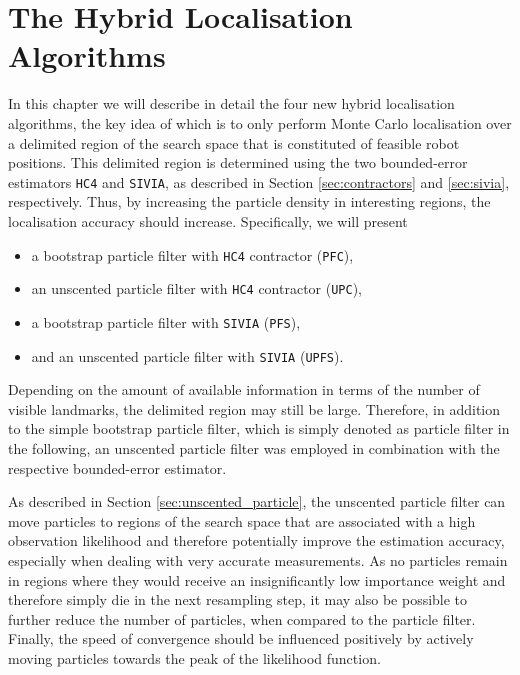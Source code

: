 \chapter{The Hybrid Localisation Algorithms} %
\label{ch:implementation}

In this chapter we will describe in detail the four new hybrid localisation algorithms, the key idea of which is to only perform Monte Carlo localisation over a delimited region of the search space that is constituted of feasible robot positions. This delimited region is determined using the two bounded-error estimators \texttt{HC4} and \texttt{SIVIA}, as described in Section \ref{sec:contractors} and \ref{sec:sivia}, respectively. Thus, by increasing the particle density in interesting regions, the localisation accuracy should increase. Specifically, we will present

\begin{itemize}
	\item a bootstrap particle filter with \texttt{HC4} contractor (\texttt{PFC}),
	\item an unscented particle filter with \texttt{HC4} contractor (\texttt{UPC}),
	\item a bootstrap particle filter with \texttt{SIVIA} (\texttt{PFS}),
	\item and an unscented particle filter with \texttt{SIVIA} (\texttt{UPFS}).
\end{itemize}

\noindent
Depending on the amount of available information in terms of the number of visible landmarks, the delimited region may still be large. Therefore, in addition to the simple bootstrap particle filter, which is simply denoted as particle filter in the following, an unscented particle filter was employed in combination with the respective bounded-error estimator.

As described in Section \ref{sec:unscented_particle}, the unscented particle filter can move particles to regions of the search space that are associated with a high observation likelihood and therefore potentially improve the estimation accuracy, especially when dealing with very accurate measurements. As no particles remain in regions where they would receive an insignificantly low importance weight and therefore simply die in the next resampling step, it may also be possible to further reduce the number of particles, when compared to the particle filter. Finally, the speed of convergence should be influenced positively by actively moving particles towards the peak of the likelihood function.

